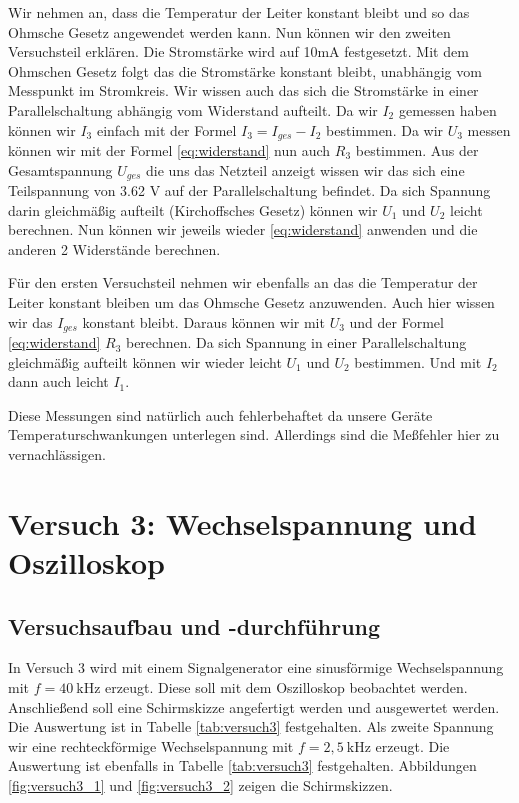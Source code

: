         Wir nehmen an, dass die Temperatur der Leiter konstant bleibt und so das Ohmsche Gesetz angewendet werden kann. Nun können wir den zweiten Versuchsteil erklären. Die Stromstärke wird auf 10mA festgesetzt. Mit dem Ohmschen Gesetz folgt das die Stromstärke konstant bleibt, unabhängig vom Messpunkt im Stromkreis. Wir wissen auch das sich die Stromstärke in einer Parallelschaltung abhängig vom Widerstand aufteilt. Da wir $I_2$ gemessen haben können wir $I_3$ einfach mit der Formel $I_3 = I_{ges} - I_2$ bestimmen. Da wir $U_3$ messen können wir mit der Formel \ref{eq:widerstand} nun auch $R_3$ bestimmen. Aus der Gesamtspannung $U_{ges}$ die uns das Netzteil anzeigt wissen wir das sich eine Teilspannung von 3.62 V auf der Parallelschaltung befindet. Da sich Spannung darin gleichmäßig aufteilt (Kirchoffsches Gesetz) können wir $U_1$ und $U_2$ leicht berechnen. Nun können wir jeweils wieder \ref{eq:widerstand} anwenden und die anderen 2 Widerstände berechnen.
        
        Für den ersten Versuchsteil nehmen wir ebenfalls an das die Temperatur der Leiter konstant bleiben um das Ohmsche Gesetz anzuwenden. Auch hier wissen wir das $I_{ges}$ konstant bleibt. Daraus können wir mit $U_3$ und der Formel \ref{eq:widerstand} $R_3$ berechnen. Da sich Spannung in einer Parallelschaltung gleichmäßig aufteilt können wir wieder leicht $U_1$ und $U_2$ bestimmen. Und mit $I_2$ dann auch leicht $I_1$. 
        
        Diese Messungen sind natürlich auch fehlerbehaftet da unsere Geräte Temperaturschwankungen unterlegen sind. Allerdings sind die Meßfehler hier zu vernachlässigen.
        \newpage

\section{Versuch 3: Wechselspannung und Oszilloskop}

    \subsection{Versuchsaufbau und -durchführung}
        
        In Versuch 3 wird mit einem Signalgenerator eine sinusförmige Wechselspannung mit $f = 40\ \mathrm{kHz}$ erzeugt. Diese soll mit dem Oszilloskop beobachtet werden. Anschließend soll eine Schirmskizze angefertigt werden und ausgewertet werden. Die Auswertung ist in Tabelle \ref{tab:versuch3} festgehalten. Als zweite Spannung wir eine rechteckförmige Wechselspannung mit $f = 2,5\ \mathrm{kHz}$ erzeugt. Die Auswertung ist ebenfalls in Tabelle \ref{tab:versuch3} festgehalten.
        Abbildungen \ref{fig:versuch3_1} und \ref{fig:versuch3_2} zeigen die Schirmskizzen.

